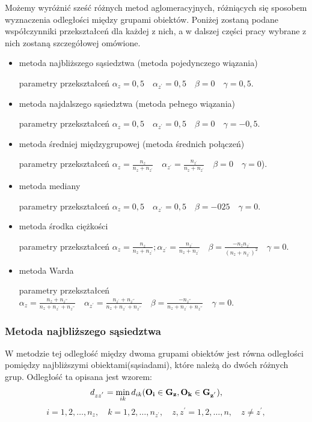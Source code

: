\documentclass[12pt,a4paper]{report}
\begin{document}
Możemy wyróżnić sześć różnych metod aglomeracyjnych, różniących się sposobem wyznaczenia odległości między grupami obiektów. Poniżej zostaną podane współczynniki przekształceń dla każdej z nich, a w dalszej części pracy wybrane z nich zostaną szczegółowej omówione.
\begin{itemize}
\item metoda najbliższego sąsiedztwa (metoda pojedynczego wiązania) 

parametry  przekształceń $\alpha_{z}=0,5 \quad \alpha_{z^{'}}=0,5 \quad  \beta=0 \quad \gamma=0,5$.
\item metoda najdalszego sąsiedztwa (metoda pełnego wiązania)

parametry  przekształceń $\alpha_{z}=0,5 \quad \alpha_{z^{'}}=0,5 \quad \beta=0 \quad \gamma=-0,5$.
\item metoda średniej międzygrupowej (metoda średnich połączeń)

parametry  przekształceń $\alpha_{z}=\frac{n_{z}}{n_{z} + n_{z^{'}}} \quad \alpha_{z^{'}}=\frac{n_{z^{'}}}{n_{z} + n_{z^{'}}} \quad \beta=0 \quad \gamma=0$).
\item metoda mediany

parametry  przekształceń $\alpha_{z}=0,5 \quad \alpha_{z^{'}}=0,5 \quad \beta=-025 \quad \gamma=0$.
\item metoda środka ciężkości

parametry  przekształceń $\alpha_{z}=\frac{n_{z}}{n_{z} + n_{z^{'}}}; \alpha_{z^{'}}=\frac{n_{z^{'}}}{n_{z} + n_{z^{'}}} \quad \beta=\frac{-n_{z}n_{z^{'}}}{(n_{z} + n_{z^{'}})^{2}} \quad \gamma=0$.
\item metoda Warda

parametry  przekształceń $\alpha_{z}=\frac{n_{z}+n_{z^{'''}}}{n_{z} + n_{z^{'}}+n_{z^{'''}}} \quad \alpha_{z^{'}}=\frac{n_{z^{'}}+n_{z^{'''}}}{n_{z} + n_{z^{'}}+n_{z^{'''}}} \quad \beta=\frac{-n_{z^{'''}}}{n_{z} + n_{z^{'}}+n_{z^{'''}}} \quad \gamma=0$.

\end{itemize}
 
\subsubsection{Metoda najbliższego sąsiedztwa}


W metodzie tej odległość między dwoma grupami obiektów jest równa odległości pomiędzy najbliższymi obiektami(sąsiadami), które należą do dwóch różnych grup. Odległość ta opisana jest wzorem:
$$
d_{zz^{'}}= \min\limits_{ik} {d_{ik}(\bf{O_i} \in G_{z}, O_{k} \in G_{z^{'}})},
$$
$$
i=1,2,\dots,n_{z}, \quad k=1,2,\dots,n_{z^{'}}, \quad z,z^{'}=1,2,\dots,n, \quad z \neq z^{'}, 
$$
\end{document}
